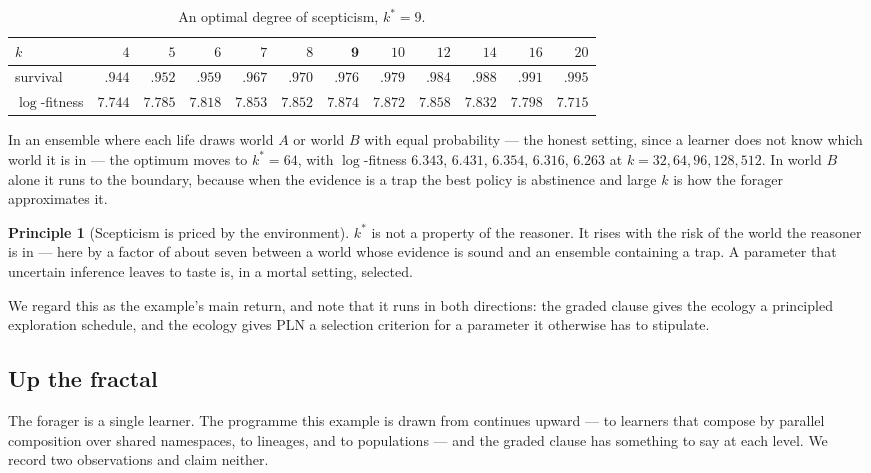 \documentclass[11pt,a4paper]{article}
\theoremstyle{plain}
\theoremstyle{definition}
\newtheorem{principle}[theorem]{Principle}
\theoremstyle{remark}
\begin{document}
\begin{table}[h]
\centering
\small
\begin{tabular}{@{}lrrrrrrrrrrr@{}}
\toprule
$k$ & $4$ & $5$ & $6$ & $7$ & $8$ & $\mathbf{9}$ & $10$ & $12$ & $14$ & $16$ & $20$ \\
\midrule
survival & $.944$ & $.952$ & $.959$ & $.967$ & $.970$ & $.976$ & $.979$ & $.984$ & $.988$ & $.991$ & $.995$ \\
$\log$-fitness & $7.744$ & $7.785$ & $7.818$ & $7.853$ & $7.852$ & $\mathbf{7.874}$ & $7.872$ & $7.858$ & $7.832$ & $7.798$ & $7.715$ \\
\bottomrule
\end{tabular}
\caption{An optimal degree of scepticism, $k^\ast = 9$.}\label{tab:ksweep}
\end{table}

\noindent
In an ensemble where each life draws world $A$ or world $B$ with equal
probability --- the honest setting, since a learner does not know which world it
is in --- the optimum moves to $k^\ast = 64$, with $\log$-fitness $6.343$,
$\mathbf{6.431}$, $6.354$, $6.316$, $6.263$ at $k = 32, 64, 96, 128, 512$. In
world $B$ alone it runs to the boundary, because when the evidence is a trap the
best policy is abstinence and large $k$ is how the forager approximates it.

\begin{principle}[Scepticism is priced by the environment]\label{prin:k}
$k^\ast$ is not a property of the reasoner. It rises with the risk of the world
the reasoner is in --- here by a factor of about seven between a world whose
evidence is sound and an ensemble containing a trap. A parameter that uncertain
inference leaves to taste is, in a mortal setting, selected.
\end{principle}

We regard this as the example's main return, and note that it runs in both
directions: the graded clause gives the ecology a principled exploration
schedule, and the ecology gives PLN a selection criterion for a parameter it
otherwise has to stipulate.

\subsection{Up the fractal}\label{ssec:fractal}

The forager is a single learner. The programme this example is drawn from
continues upward --- to learners that compose by parallel composition over shared
namespaces, to lineages, and to populations --- and the graded clause has
something to say at each level. We record two observations and claim neither.
\end{document}
